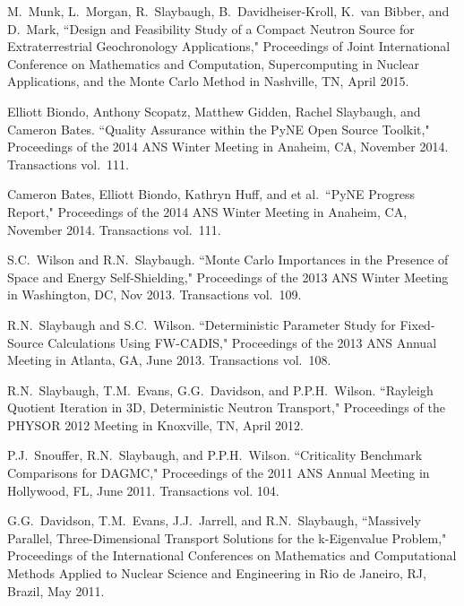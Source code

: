 \begin{bibsection}
\item  M.\ Munk, L.\ Morgan, R.\ Slaybaugh, B.\ Davidheiser-Kroll, K.\ van Bibber, and D.\ Mark, ``Design and Feasibility Study of a Compact Neutron Source for Extraterrestrial Geochronology Applications," Proceedings of Joint International Conference on Mathematics and Computation, Supercomputing in Nuclear Applications, and the Monte Carlo Method in Nashville, TN, April 2015.

\item Elliott Biondo, Anthony Scopatz, Matthew Gidden, Rachel Slaybaugh, and Cameron Bates. ``Quality Assurance within the PyNE Open Source Toolkit,"  Proceedings of the 2014 ANS Winter Meeting in Anaheim, CA, November 2014. Transactions vol.\ 111.

\item Cameron Bates, Elliott Biondo, Kathryn Huff, and et al.\ ``PyNE Progress Report," Proceedings of the 2014 ANS Winter Meeting in Anaheim, CA, November 2014. Transactions vol.\ 111.

\item S.C.\ Wilson and R.N.\ Slaybaugh. ``Monte Carlo Importances in the Presence of Space and Energy Self-Shielding," Proceedings of the 2013 ANS Winter Meeting in Washington, DC, Nov 2013. Transactions vol.\ 109.

\item R.N.\ Slaybaugh and  S.C.\ Wilson. ``Deterministic Parameter Study for Fixed-Source Calculations Using FW-CADIS," Proceedings of the 2013 ANS Annual Meeting in Atlanta, GA, June 2013. Transactions vol.\ 108.

\item R.N.\ Slaybaugh, T.M.\ Evans, G.G.\ Davidson, and P.P.H.\ Wilson. ``Rayleigh Quotient Iteration in 3D, Deterministic Neutron Transport," Proceedings of the PHYSOR 2012 Meeting in Knoxville, TN, April 2012.

\item P.J.\ Snouffer, R.N.\ Slaybaugh, and P.P.H.\ Wilson. ``Criticality Benchmark Comparisons for DAGMC," Proceedings of the 2011 ANS Annual Meeting in Hollywood, FL, June 2011. Transactions vol. 104.

\item G.G.\ Davidson, T.M.\ Evans, J.J.\ Jarrell, and R.N.\ Slaybaugh, ``Massively Parallel, Three-Dimensional Transport Solutions for the k-Eigenvalue Problem," Proceedings of the International Conferences on Mathematics and Computational Methods Applied to Nuclear Science and Engineering in Rio de Janeiro, RJ, Brazil, May 2011.


\end{bibsection}
